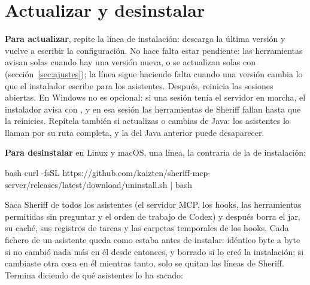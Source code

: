 \documentclass[11pt,a4paper]{article}
\begin{document}



\section{Actualizar y desinstalar}
\label{sec:desinstalar}

\textbf{Para actualizar}, repite la línea de instalación: descarga la última
versión y vuelve a escribir la configuración. No hace falta estar pendiente:
las herramientas avisan solas cuando hay una versión nueva, o se actualizan
solas con  (sección~\ref{sec:ajustes}); la línea
sigue haciendo falta cuando una versión cambia lo que el instalador escribe
para los asistentes. Después, reinicia las sesiones
abiertas. En Windows no es opcional: si una sesión tenía el servidor en marcha,
el instalador avisa con , y en esa sesión las herramientas de Sheriff fallan hasta que la
reinicies. Repítela también si actualizas o cambias de Java: los asistentes lo
llaman por su ruta completa, y la del Java anterior puede desaparecer.

\textbf{Para desinstalar} en Linux y macOS, una línea, la contraria de la de
instalación:

\begin{command}{bash}
curl -fsSL https://github.com/kaizten/sheriff-mcp-server/releases/latest/download/uninstall.sh | bash
\end{command}

Saca Sheriff de todos los asistentes (el servidor MCP, los hooks, las
herramientas permitidas sin preguntar y el orden de trabajo de Codex) y después
borra el jar, su caché, sus registros de tareas y las carpetas temporales de
los hooks. Cada fichero de un asistente queda como estaba antes de instalar:
idéntico byte a byte si no cambió nada más en él desde entonces, y borrado si
lo creó la instalación; si cambiaste otra cosa en él mientras tanto, solo se
quitan las líneas de Sheriff. Termina diciendo de qué asistentes lo ha sacado:
\end{document}
